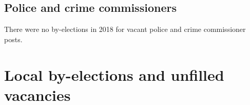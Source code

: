 \documentclass[a4paper,openany]{book}
\begin{document}
\section{Police and crime commissioners}

There were no by-elections in 2018 for vacant police and crime commissioner posts.

\chapter{Local by-elections and unfilled vacancies}

\begin{resultsiii}

%
%
%
%
%
%
%
%
%


\end{resultsiii}
\end{document}
